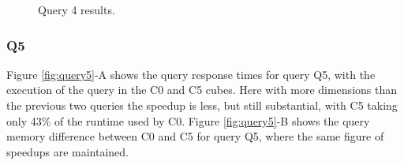 \begin{figure}[H]
  \caption{Query 4 results.}\label{fig:query4}
  \vspace{6mm}
  \begin{center}
  \end{center}
  \vspace{2mm}
\end{figure}

\hypertarget{q5-1}{%
\subsubsection{Q5}\label{q5-1}}

Figure \ref{fig:query5}-A shows the query response times for query Q5, with the execution of the query in the C0 and C5 cubes.
Here with more dimensions than the previous two queries the speedup is less, but still substantial, with C5 taking only 43\% of the runtime used by C0.
Figure \ref{fig:query5}-B shows the query memory difference between C0 and C5 for query Q5, where the same figure of speedups are maintained.

